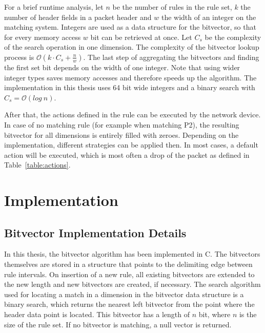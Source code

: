 \documentclass[a4paper,
		12pt,
		parskip=full,
		titlepage
		]{scrartcl}
\begin{document}
For a brief runtime analysis, let $n$ be the number of rules in the rule set, 
$k$ the number of header fields in a packet header and $w$ the width of an integer on the matching system.
Integers are used as a data structure for the bitvector, so that for every memory access $w$ bit can be retrieved at once.
Let $C_s$ be the complexity of the search operation in one dimension.
The complexity of the bitvector lookup process is $\mathcal O(k \cdot C_s + \frac{n}{w})$.
The last step of aggregating the bitvectors and finding the first set bit depends on the width of one integer.
Note that using wider integer types saves memory accesses and therefore speeds up the algorithm.
The implementation in this thesis uses 64 bit wide integers and a binary search with $C_s = \mathcal O(log\ n)$.

After that, the actions defined in the rule can be executed by the network device.
In case of no matching rule (for example when matching P2), the resulting bitvector for all dimensions is entirely filled with zeroes.
Depending on the implementation, different strategies can be applied then.
In most cases, a default action will be executed, 
which is most often a drop of the packet as defined in Table~\ref{table:actions}.

\section{Implementation}
\subsection{Bitvector Implementation Details}
In this thesis, the bitvector algorithm has been implemented in C.
The bitvectors themselves are stored in a structure that points to the delimiting edge
between rule intervals.
On insertion of a new rule, all existing bitvectors are extended to the new length and new bitvectors 
are created, if necessary.
The search algorithm used for locating a match in a dimension in the bitvector 
data structure is a binary search, which returns the nearest left bitvector from the point where 
the header data point is located.
This bitvector has a length of $n$ bit, where $n$ is the size of the rule set.
If no bitvector is matching, a null vector is returned.
\end{document}
